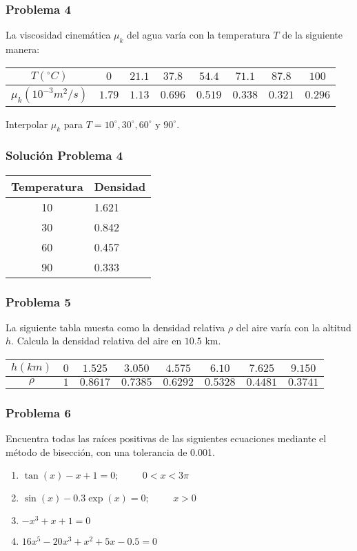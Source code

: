 \begin{frame}
\frametitle{Problema 4}
La viscosidad cinem\'{a}tica $\mu_{k}$ del agua var\'{i}a con la temperatura $T$ de la siguiente manera:
	\begin{table}[H]
		\centering
		\fontsize{12}{12}\selectfont
				\begin{tabulary}{15cm}{c | c | c | c | c | c | c | c }
					$T(^\circ C)$ & $0$ & $21.1$ & $37.8$ & $54.4$ & $71.1$ & $87.8$ & $100$ \\
					\midrule
					$\mu_{k} (10^{-3}m^{2}/s)$ & $1.79$ & $1.13$ & $0.696$ & $0.519$ & $0.338$ & $0.321$ & $0.296$ 
				\end{tabulary}
	\end{table}
	Interpolar $\mu_{k}$ para $T= 10^{\circ},30^{\circ},60^{\circ}$ y $90^{\circ}$.
\end{frame}
\begin{frame}
\frametitle{Soluci\'{o}n Problema 4}
\begin{center}
	 \begin{tabular}{c | l}
			Temperatura & Densidad \\ \hline
			10 & 1.621 \\ \hline
			30 & 0.842 \\ \hline
			60 & 0.457 \\ \hline
			90 & 0.333 	 
	 \end{tabular}
\end{center}
\end{frame}
\begin{frame}
\frametitle{Problema 5}
La siguiente tabla muesta como la densidad relativa $\rho$ del aire var\'{i}a con la altitud $h$. Calcula la densidad relativa del aire en $10.5$ km.
	\begin{table}[H]
		\centering 
		\fontsize{12}{12}\selectfont
			\begin{tabulary}{15cm}{c | c | c | c | c | c | c | c }
				$h(km)$ & $0$ & $1.525$ & $3.050$ & $4.575$ & $6.10$ & $7.625$ & $9.150$ \\
				\midrule
				$\rho$ & $1$ & $0.8617$ & $0.7385$ & $0.6292$ & $0.5328$ & $0.4481$ & $0.3741$ 
			\end{tabulary}
	\end{table}
\end{frame}
\begin{frame}
\frametitle{Problema 6}
Encuentra todas las ra\'{i}ces positivas de las siguientes ecuaciones mediante el m\'{e}todo de bisecci\'{o}n, con una tolerancia de 0.001.
	\begin{enumerate}\label{grupo1}
	\renewcommand{\arraystretch}{1.5}
		\item $\tan(x) - x + 1 = 0; \hspace{1cm} 0 < x < 3\pi$
		\item $\sin(x) - 0.3 \exp(x) = 0; \hspace{1cm} x > 0$
		\item $-x^{3} + x + 1 = 0$
		\item $16x^{5} - 20x^{3} + x^{2} + 5x - 0.5 = 0$
	\end{enumerate}
\end{frame}
